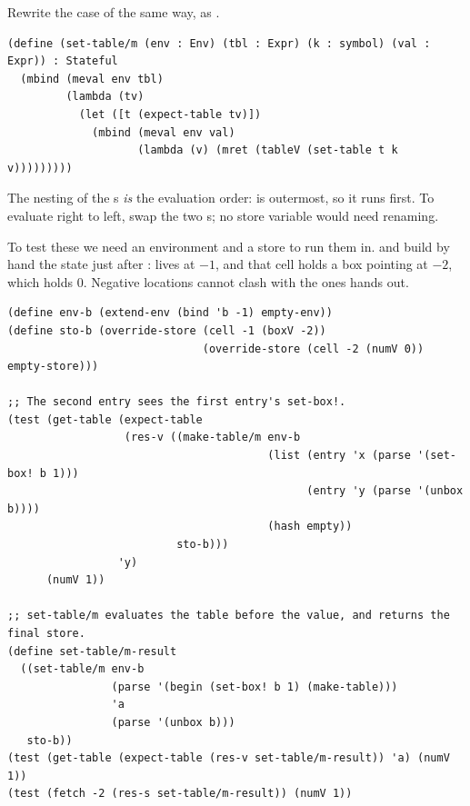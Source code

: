 \begin{exercise}
Rewrite the  case of  the same way, as .
\end{exercise}
\begin{solution}
\begin{lstlisting}
(define (set-table/m (env : Env) (tbl : Expr) (k : symbol) (val : Expr)) : Stateful
  (mbind (meval env tbl)
         (lambda (tv)
           (let ([t (expect-table tv)])
             (mbind (meval env val)
                    (lambda (v) (mret (tableV (set-table t k v)))))))))
\end{lstlisting}
The nesting of the s \emph{is} the evaluation order:  is outermost, so it runs first. To evaluate right to left, swap the two s; no store variable would need renaming.
\end{solution}

To test these we need an environment and a store to run them in.  and  build by hand the state just after :  lives at $-1$, and that cell holds a box pointing at $-2$, which holds 0. Negative locations cannot clash with the ones  hands out.
\begin{lstlisting}
(define env-b (extend-env (bind 'b -1) empty-env))
(define sto-b (override-store (cell -1 (boxV -2))
                              (override-store (cell -2 (numV 0)) empty-store)))

;; The second entry sees the first entry's set-box!.
(test (get-table (expect-table
                  (res-v ((make-table/m env-b
                                        (list (entry 'x (parse '(set-box! b 1)))
                                              (entry 'y (parse '(unbox b))))
                                        (hash empty))
                          sto-b)))
                 'y)
      (numV 1))

;; set-table/m evaluates the table before the value, and returns the final store.
(define set-table/m-result
  ((set-table/m env-b
                (parse '(begin (set-box! b 1) (make-table)))
                'a
                (parse '(unbox b)))
   sto-b))
(test (get-table (expect-table (res-v set-table/m-result)) 'a) (numV 1))
(test (fetch -2 (res-s set-table/m-result)) (numV 1))
\end{lstlisting}

